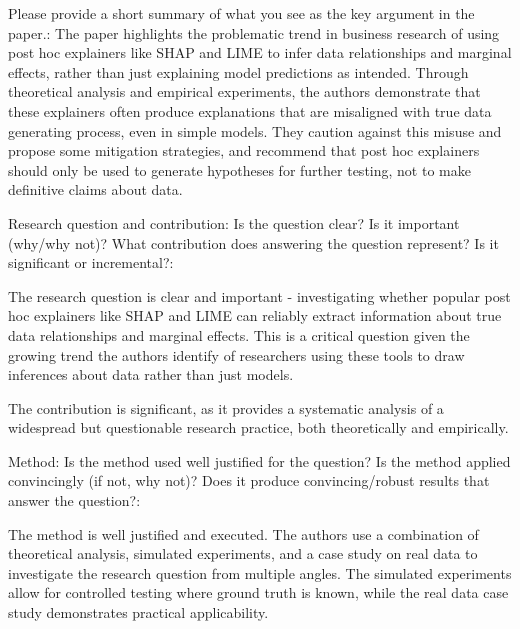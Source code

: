 \documentclass[11pt]{article}
\newcounter{se}[section]
\newcounter{reviewer}
\newcounter{point}[reviewer]
\renewcommand{\thepoint}{R\,\thereviewer.\arabic{point}}
\newenvironment{point}{
    \refstepcounter{point} \bigskip \noindent {\textbf{\thepoint}}: \rmfamily \itshape
}{\medskip}
\newenvironment{point*}{\bigskip \noindent \rmfamily \itshape}{\medskip} %
\newenvironment{reply}
 {\par\medskip \noindent \begin{sf}\textbf{Reply}:\ }
 {\medskip \end{sf}}
\begin{document}
\begin{point*}
Please provide a short summary of what you see as the key argument in the paper.: The paper highlights the problematic trend in business research of using post hoc explainers like SHAP and LIME to infer data relationships and marginal effects, rather than just explaining model predictions as intended. Through theoretical analysis and empirical experiments, the authors demonstrate that these explainers often produce explanations that are misaligned with true data generating process, even in simple models. They caution against this misuse and propose some mitigation strategies, and recommend that post hoc explainers should only be used to generate hypotheses for further testing, not to make definitive claims about data. 


Research question and contribution: Is the question clear? Is it important (why/why not)? What contribution does answering the question represent? Is it significant or incremental?: 

The research question is clear and important - investigating whether popular post hoc explainers like SHAP and LIME can reliably extract information about true data relationships and marginal effects. This is a critical question given the growing trend the authors identify of researchers using these tools to draw inferences about data rather than just models.

The contribution is significant, as it provides a systematic analysis of a widespread but questionable research practice, both theoretically and empirically.


Method: Is the method used well justified for the question? Is the method applied convincingly (if not, why not)? Does it produce convincing/robust results that answer the question?:

The method is well justified and executed. The authors use a combination of theoretical analysis, simulated experiments, and a case study on real data to investigate the research question from multiple angles. The simulated experiments allow for controlled testing where ground truth is known, while the real data case study demonstrates practical applicability. 
\end{point*}
\end{document}
